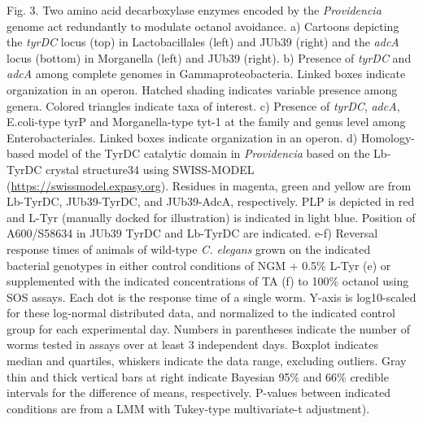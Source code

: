 \documentclass[]{article}
\begin{document}
Fig. 3. Two amino acid decarboxylase enzymes encoded by the
\textit{Providencia} genome act redundantly to modulate octanol
avoidance. a) Cartoons depicting the \textit{tyrDC} locus (top) in
Lactobacillales (left) and JUb39 (right) and the \textit{adcA} locus
(bottom) in Morganella (left) and JUb39 (right). b) Presence of
\textit{tyrDC} and \textit{adcA} among complete genomes in
Gammaproteobacteria. Linked boxes indicate organization in an operon.
Hatched shading indicates variable presence among genera. Colored
triangles indicate taxa of interest. c) Presence of \textit{tyrDC},
\textit{adcA}, E.coli-type tyrP and Morganella-type tyt-1 at the family
and genus level among Enterobacteriales. Linked boxes indicate
organization in an operon. d) Homology-based model of the TyrDC
catalytic domain in \textit{Providencia} based on the Lb-TyrDC crystal
structure34 using SWISS-MODEL (\url{https://swissmodel.expasy.org}).
Residues in magenta, green and yellow are from Lb-TyrDC, JUb39-TyrDC,
and JUb39-AdcA, respectively. PLP is depicted in red and L-Tyr (manually
docked for illustration) is indicated in light blue. Position of
A600/S58634 in JUb39 TyrDC and Lb-TyrDC are indicated. e-f) Reversal
response times of animals of wild-type \textit{C. elegans} grown on the
indicated bacterial genotypes in either control conditions of NGM +
0.5\% L-Tyr (e) or supplemented with the indicated concentrations of TA
(f) to 100\% octanol using SOS assays. Each dot is the response time of
a single worm. Y-axis is log10-scaled for these log-normal distributed
data, and normalized to the indicated control group for each
experimental day. Numbers in parentheses indicate the number of worms
tested in assays over at least 3 independent days. Boxplot indicates
median and quartiles, whiskers indicate the data range, excluding
outliers. Gray thin and thick vertical bars at right indicate Bayesian
95\% and 66\% credible intervals for the difference of means,
respectively. P-values between indicated conditions are from a LMM with
Tukey-type multivariate-t adjustment).
\end{document}

